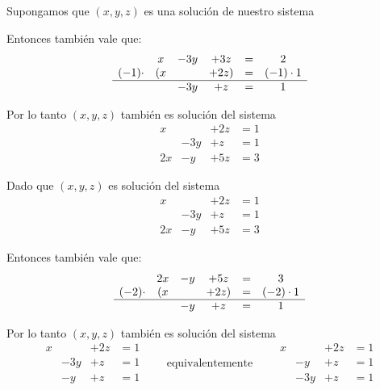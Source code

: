 \documentclass[handout]{beamer} %
\renewcommand{\_}[1]{_{\left( #1 \right)}}
\renewcommand{\^}[1]{^{\left( #1 \right)}}
\begin{document}
\begin{frame}

Supongamos que $(x,y,z)$ es una solución de nuestro sistema


 
Entonces también vale que: 
\begin{equation*}
\begin{matrix}
&x& -3y & +3z & = & 2 \\
(-1)\cdot&(x &  & +2z) & = &(-1)\cdot1 \\
\hline
&& -3y & +z & = & 1  
\end{matrix}
\end{equation*}

 \pause
Por lo tanto $(x,y,z)$ también es solución del sistema
\begin{equation*}
\begin{matrix}
x &  & +2z & = 1 \\
& -3y & +z & = 1   \\
2x& -y & +5z & =3
\end{matrix}
\end{equation*}
\end{frame}


\begin{frame}
Dado que $(x,y,z)$ es solución del sistema
\begin{equation*}
\begin{matrix}
x &  & +2z & = 1 \\
& -3y & +z & = 1   \\
2x& -y & +5z & =3
\end{matrix}
\end{equation*}

 
Entonces también vale que: 
\begin{equation*}
\begin{matrix}
&2x& -y & +5z & = &3 \\
(-2)\cdot&(x &  & +2z) & = &(-2)\cdot1 \\
\hline
& & -y & + z & = & 1  
\end{matrix}
\end{equation*}
\pause
 
Por lo tanto $(x,y,z)$ también es solución del sistema
\begin{equation*}
\begin{matrix}
x &  & +2z & = 1 \\
& -3y & +z & = 1   \\
& -y & +z & =1
\end{matrix}
\qquad\mbox{equivalentemente}\qquad
\begin{matrix}
x &  & +2z & = 1 \\
& -y & +z & =1\\
& -3y & +z & = 1 
\end{matrix}
\end{equation*}
\end{frame}
\end{document}
